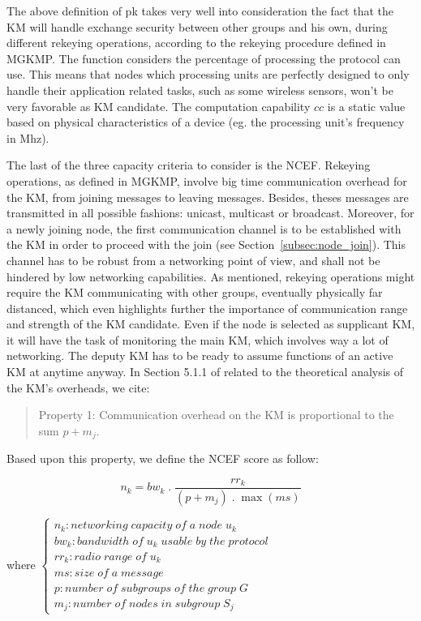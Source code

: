 The above definition of pk takes very well into consideration the fact that the KM will handle exchange security between other groups and his own, during different rekeying operations, according to the rekeying procedure defined in MGKMP. The function considers the percentage of processing the protocol can use. This means that nodes which processing units are perfectly designed to only handle their application related tasks, such as some wireless sensors, won’t be very favorable as KM candidate. The computation capability $cc$ is a static value based on physical characteristics of a device (eg. the processing unit’s frequency in Mhz).

The last of the three capacity criteria to consider is the NCEF. Rekeying operations, as defined in MGKMP, involve big time communication overhead for the KM, from joining messages to leaving messages. Besides, theses messages are transmitted in all possible fashions: unicast, multicast or broadcast. Moreover, for a newly joining node, the first communication channel is to be established with the KM in order to proceed with the join (see Section~\ref{subsec:node_join}). This channel has to be robust from a networking point of view, and shall not be hindered by low networking capabilities. As mentioned, rekeying operations might require the KM communicating with other groups, eventually physically far distanced, which even highlights further the importance of communication range and strength of the KM candidate. Even if the node is selected as supplicant KM, it will have the task of monitoring the main KM, which involves way a lot of networking. The deputy KM has to be ready to assume functions of an active KM at anytime anyway. In Section 5.1.1 of \cite{kandi_versatile_2020} related to the theoretical analysis of the KM's overheads, we cite:

\begin{quote}
	Property 1: Communication overhead on the KM is proportional to the sum $p+m_j$.
\end{quote}

Based upon this property, we define the NCEF score as follow:

\begin{equation}\label{eq3}
	n_k = bw_k \; .\; \frac{rr_k}{\left( p + m_j \right) \; .\; \max\left( ms \right)}
\end{equation}

where
\begin{math}
	\left\{
	\begin{array}{l}
		n_k: networking\; capacity\; of\; a\; node\; u_k\\
		bw_k: bandwidth\; of\; u_k\; usable\; by\; the\; protocol\\
		rr_k: radio\; range\; of\; u_k\\
		ms: size\; of\; a\; message\\
		p: number\; of\; subgroups\; of\; the\; group\; G\\
		m_j: number\; of\; nodes\; in\; subgroup\; S_j
	\end{array}
	\right.
\end{math}\\

